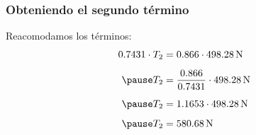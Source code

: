\documentclass[12pt]{beamer}
\begin{document}
\begin{frame}
\frametitle{Obteniendo el segundo término}
Reacomodamos los términos:
\pause
\begin{eqnarray*}
\begin{aligned}
0.7431 \cdot T_{2} &= 0.866 \cdot \SI{498.28}{\newton} \\[0.5em] \pause
T_{2} &= \dfrac{0.866}{0.7431} \cdot \SI{498.28}{\newton} \\[0.5em] \pause
T_{2} &= 1.1653 \cdot \SI{498.28}{\newton} \\[0.5em] \pause
T_{2} &= \SI{580.68}{\newton}
\end{aligned}
\end{eqnarray*}
\end{frame}
\end{document}
